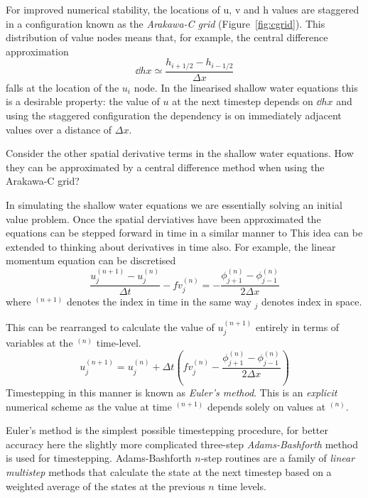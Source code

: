 \documentclass[a4paper, sfsidenotes, twoside]{tufte-handout}
\begin{document}
  For improved numerical stability, the locations of u, v and h values are
  staggered in a configuration known as the \emph{Arakawa-C grid} (Figure~\ref{fig:cgrid}).
  This distribution of value nodes means that, for example, the central difference
  approximation
  \begin{equation}
    \dd{h}{x} \simeq \frac{h_{i+1/2} - h_{i-1/2}}{\Delta x}
  \end{equation}
  falls at the location of the $u_i$ node.
  In the linearised shallow water equations this is a desirable property:
  the value of $u$ at the next timestep depends on $\dd{h}{x}$ and using
  the staggered configuration the dependency is on immediately adjacent values
  over a distance of $\Delta x$.

  Consider the other spatial derivative terms in the shallow water equations.
  How they can be approximated by a central difference method when using the
  Arakawa-C grid?


  In simulating the shallow water equations we are essentially solving
  an initial value problem.
  Once the spatial derviatives have been approximated the equations can
  be stepped forward in time in a similar manner to
  This idea can be extended to thinking about derivatives in time also.
  For example, the linear momentum equation can be discretised
  \begin{equation}
    \frac{u_j^{(n+1)} - u_j^{(n)}}{\Delta t} - fv_j^{(n)} = - \frac{\phi_{j+1}^{(n)} - \phi_{j-1}^{(n)}}{2 \Delta x}
  \end{equation}
  where $^{(n+1)}$ denotes the index in time in the same way $_j$ denotes
  index in space.

  This can be rearranged to calculate the value of $u_j^{(n+1)}$ entirely in
  terms of variables at the $^{(n)}$ time-level.
  \begin{equation}
    u_j^{(n+1)} = u_j^{(n)} + {\Delta t}
      \left( fv_j^{(n)} - \frac{\phi_{j+1}^{(n)} - \phi_{j-1}^{(n)}}{2 \Delta x} \right)
  \end{equation}
  Timestepping in this manner is known as \emph{Euler's method}.
  This is an \emph{explicit} numerical scheme as the value at time $^{(n+1)}$
  depends solely on values at $^{(n)}$.

  Euler's method is the simplest possible timestepping procedure,
  for better accuracy here the slightly more complicated three-step \emph{Adams-Bashforth}
  method is used for timestepping.  Adams-Bashforth $n$-step routines are a family
  of \emph{linear multistep} methods that calculate the state at the next timestep
  based on a weighted average of the states at the previous $n$ time levels.
\end{document}
